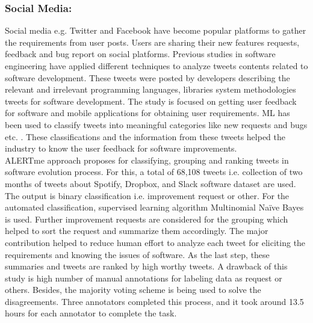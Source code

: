 \subsubsection{Social Media: }
Social media e.g. Twitter and Facebook have become popular platforms to gather the
requirements from user posts. Users are sharing their new features requests, feedback and bug
report on social platforms. Previous studies \cite{Singer:2014} \cite{Prasetyo} \cite{Achananuparp:2012} in software engineering have applied different techniques to analyze tweets contents related to software development. These tweets were posted by developers describing the relevant and irrelevant programming languages, libraries system methodologies tweets for software development. The study is focused on getting user feedback for software and mobile applications for obtaining user requirements. ML has been used to classify tweets into meaningful
categories like new requests and bugs etc. \cite{guzman2017} \cite{williams2017}. These classifications and the information
from these tweets helped the industry to know the user feedback for software improvements.\\

	ALERTme \cite{guzman2017} approach proposes for classifying, grouping and ranking tweets in software
evolution process. For this, a total of 68,108 tweets i.e. collection of two months of tweets about
Spotify, Dropbox, and Slack software dataset are used. The output is binary classification i.e.
improvement request or other. For the automated classification, supervised learning algorithm Multinomial Naïve Bayes is used.  
Further improvement requests are considered for the
grouping which helped to sort the request and summarize them accordingly. The major contribution helped to reduce human
effort to analyze each tweet for eliciting the requirements and knowing the issues of software. As the last step, these summaries and tweets are ranked by high
worthy tweets. A drawback of this study is high number of manual annotations for labeling data as request or others. Besides, the majority voting scheme is being used to solve the
disagreements. Three annotators completed this process, and it took around 13.5 hours for each
annotator to complete the task.\\

